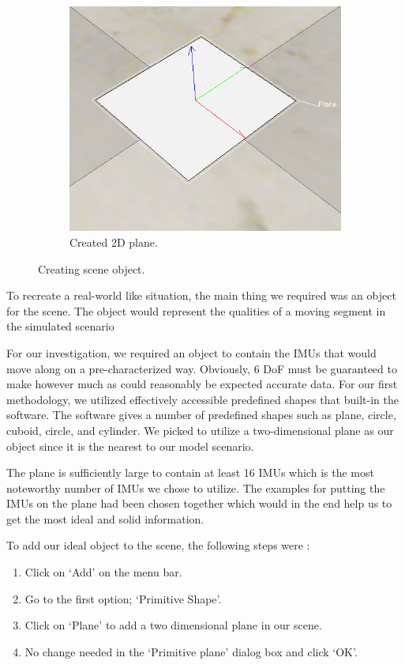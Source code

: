 \begin{figure}[h!]
\begin{subfigure}[b]{0.6\linewidth}
    \includegraphics[width=\linewidth]{figures/plane.png}
    \caption{Created 2D plane.}
  \end{subfigure}
  \caption{Creating scene object.}
  \label{fig:scene_object}
\end{figure}

To recreate a real-world like situation, the main thing we required was an object for the scene. The object would represent the qualities of a moving segment in the simulated scenario

For our investigation, we required an object to contain the IMUs that would move along on a pre-characterized way. Obviously, 6 DoF must be guaranteed to make however much as could reasonably be expected accurate data. For our first methodology, we utilized effectively accessible predefined shapes that built-in the software. The software gives a number of predefined shapes such as plane, circle, cuboid, circle, and cylinder. We picked to utilize a two-dimensional plane as our object since it is the nearest to our model scenario. 



The plane is sufficiently large to contain at least 16 IMUs which is the most noteworthy number of IMUs we chose to utilize. The examples for putting the IMUs on the plane had been chosen together which would in the end help us to get the most ideal and solid information. 

To add our ideal object to the scene, the following steps were :
\begin{enumerate}
  \item Click on ‘Add’ on the menu bar.
  \item Go to the first option; ‘Primitive Shape’.
  \item Click on ‘Plane’ to add a two dimensional plane in our scene.
  \item No change needed in the ‘Primitive plane’ dialog box and click ‘OK’.
\end{enumerate}


